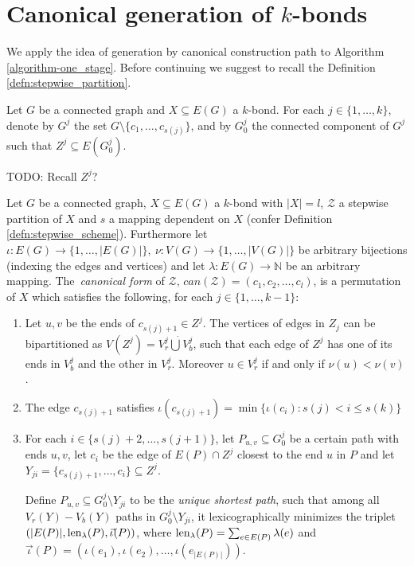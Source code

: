 \clearpage

\section{Canonical generation of $k$-bonds}

We apply the idea of generation by canonical construction path to Algorithm \ref{algorithm-one_stage}. Before continuing we suggest to recall the Definition \ref{defn:stepwise_partition}.

Let $G$ be a connected graph and $X \subseteq E(G)$ a $k$-bond. For each \break $j \in \{1, \ldots, k\}$, denote by $G^j$ the set $G \setminus \{c_{1}, \ldots, c_{s(j)}\}$, and by $G^j_0$ the connected component of $G^j$ such that $Z^j \subseteq E(G^j_0)$.

TODO: Recall $Z^j$?

\begin{defn}
	\label{can}

	Let $G$ be a connected graph, $X \subseteq E(G)$ a $k$-bond with $\lvert X \rvert = l$, $\mathcal{Z}$ a stepwise partition of $X$ and $s$ a mapping dependent on $X$ (confer Definition \ref{defn:stepwise_scheme}). Furthermore let
	$\iota : E(G) \rightarrow \{1,\ldots,\lvert E(G) \rvert\}, \> \nu : V(G) \rightarrow \{1,\ldots,\lvert V(G) \rvert\}$ be arbitrary bijections (indexing the edges and vertices) and let $\lambda : E(G) \rightarrow \mathbb{N}$ be an arbitrary mapping. The~\textit{canonical form} of $\mathcal{Z}$, $can(\mathcal{Z}) = (c_1, c_2,\ldots, c_l)$, is a permutation of $X$ which satisfies the following, for each $j \in \{1,\ldots,k-1\}$:

	\begin{enumerate}[label=\alph*.]
		\item Let $u,v$ be the ends of $c_{s(j)+1} \in Z^j$. The vertices of edges in $Z_j$ can be bipartitioned as $V(Z^j) = V^j_r \dot\bigcup V^j_b$, such that each edge of $Z^j$ has one of its ends in $V_b^j$ and the other in $V_r^j$. Moreover $u \in V_r^j$ if and only if $\nu(u) < \nu(v)$.

		\item The edge $c_{s(j)+1}$ satisfies ${\iota(c_{s(j)+1}) = \min\{ \iota(c_i) : s(j) < i \leq s(k) \}}$

	\item For each $i \in \{s(j) + 2,\ldots, s(j+1)\}$,
		let $P_{u,v} \subseteq G^j_0$ be a certain path with ends $u,v$,
		let $c_i$ be the edge of $E(P) \cap Z^j$ closest to the end $u$ in $P$ and let
		$Y_{ji} = \{c_{s(j)+1}, \ldots, c_i\} \subseteq Z^j$.

		Define $P_{u,v} \subseteq G_0^j \setminus Y_{ji}$ to be the \textit{unique shortest path}, such that among all $V_r(Y){-}V_b(Y)$ paths in $G^j_0 \setminus Y_{ji}$, it lexicographically minimizes the triplet
	$(\lvert E(P) \rvert, \operatorname{len}_\lambda(P), \vec{\iota}(P) )$, where $\operatorname{len}_\lambda(P) = \sum_{e \in E(P)} \lambda(e)$ and $\vec{\iota}(P) = (\iota(e_1), \iota(e_2),\ldots, \iota(e_{\lvert E(P) \rvert}))$.

	\end{enumerate}

\end{defn}


